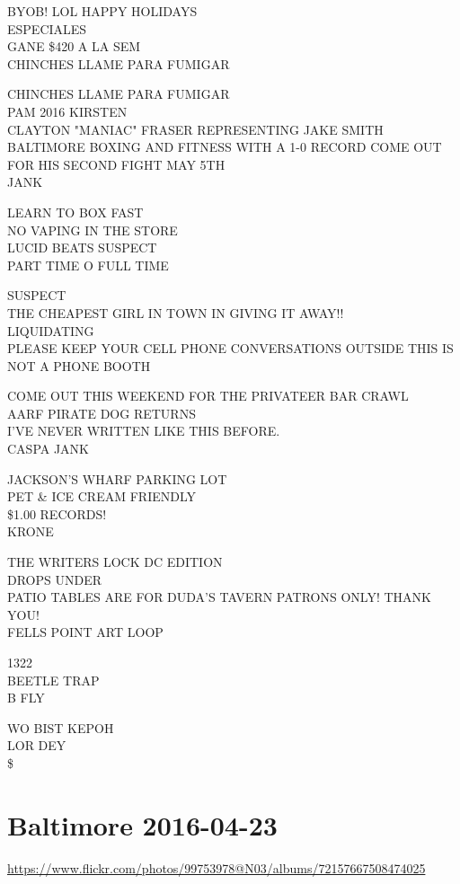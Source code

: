 \documentclass[10pt,letterpaper]{article}
\begin{document}
BYOB! LOL HAPPY HOLIDAYS\\
ESPECIALES\\
GANE \$420 A LA SEM\\
CHINCHES LLAME PARA FUMIGAR

CHINCHES LLAME PARA FUMIGAR\\
PAM 2016 KIRSTEN\\
CLAYTON "MANIAC" FRASER REPRESENTING JAKE SMITH BALTIMORE BOXING AND FITNESS WITH A 1{-}0 RECORD COME OUT FOR HIS SECOND FIGHT MAY 5TH\\
JANK

LEARN TO BOX FAST\\
NO VAPING IN THE STORE\\
LUCID BEATS SUSPECT\\
PART TIME O FULL TIME

SUSPECT\\
THE CHEAPEST GIRL IN TOWN IN GIVING IT AWAY!!\\
LIQUIDATING\\
PLEASE KEEP YOUR CELL PHONE CONVERSATIONS OUTSIDE THIS IS NOT A PHONE BOOTH

COME OUT THIS WEEKEND FOR THE PRIVATEER BAR CRAWL\\
AARF PIRATE DOG RETURNS\\
I'VE NEVER WRITTEN LIKE THIS BEFORE.\\
CASPA JANK

JACKSON'S WHARF PARKING LOT\\
PET \& ICE CREAM FRIENDLY\\
\$1.00 RECORDS!\\
KRONE

THE WRITERS LOCK DC EDITION\\
DROPS UNDER\\
PATIO TABLES ARE FOR DUDA'S TAVERN PATRONS ONLY!  THANK YOU!\\
FELLS POINT ART LOOP

1322\\
BEETLE TRAP\\
B FLY

WO BIST KEPOH\\
LOR DEY\\
\$


\section*{Baltimore 2016-04-23}

\url{https://www.flickr.com/photos/99753978@N03/albums/72157667508474025}
\end{document}

